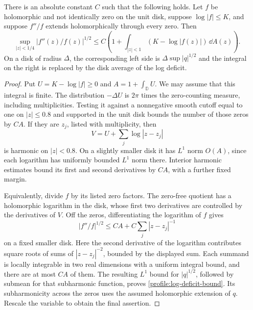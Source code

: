 \begin{lemma}
\label{lem:log-deficit}
There is an absolute constant \(C\) such that the following holds.
Let \(f\) be holomorphic and not identically zero on the unit disk,
suppose \(\log|f|\le K\), and suppose \(f''/f\) extends
holomorphically through every zero. Then
\begin{equation}
 \label{profile:log-deficit-bound}
 \sup_{|z|<1/4}|f''(z)/f(z)|^{1/2}
 \le C\left(1+\int_{|z|<1}(K-\log|f(z)|)\,\dd A(z)\right).
\end{equation}
On a disk of radius \(\Delta\), the corresponding left side is
\(\Delta\sup|q|^{1/2}\) and the integral on the right is replaced
by the disk average of the log deficit.
\end{lemma}

\begin{proof}
Put \(U=K-\log|f|\ge0\) and
\(A=1+\int_{\mathbb D}U\). We may assume that this integral is
finite. The distribution \(-\Delta U\) is \(2\pi\) times the
zero-counting measure, including multiplicities. Testing it against
a nonnegative smooth cutoff equal to one on \(|z|\le0.8\) and
supported in the unit disk bounds the number of those zeros by
\(CA\). If they are \(z_j\), listed with multiplicity, then
\[
 V=U+\sum_j\log|z-z_j|
\]
is harmonic on \(|z|<0.8\). On a slightly smaller disk it has
\(L^1\) norm \(O(A)\), since each logarithm has uniformly bounded
\(L^1\) norm there. Interior harmonic estimates bound its first
and second derivatives by \(CA\), with a further fixed margin.

Equivalently, divide \(f\) by its listed zero factors. The
zero-free quotient has a holomorphic logarithm in the disk, whose
first two derivatives are controlled by the derivatives of \(V\).
Off the zeros, differentiating the logarithm of \(f\) gives
\[
 |f''/f|^{1/2}\le CA+C\sum_j|z-z_j|^{-1}
\]
on a fixed smaller disk. Here the second derivative of the
logarithm contributes square roots of sums of
\(|z-z_j|^{-2}\), bounded by the displayed sum. Each summand is
locally integrable in two real dimensions with a uniform integral
bound, and there are at most \(CA\) of them. The resulting
\(L^1\) bound for \(|q|^{1/2}\), followed by submean for that
subharmonic function, proves
\eqref{profile:log-deficit-bound}. Its subharmonicity across the
zeros uses the assumed holomorphic extension of \(q\). Rescale the
variable to obtain the final assertion.
\end{proof}

